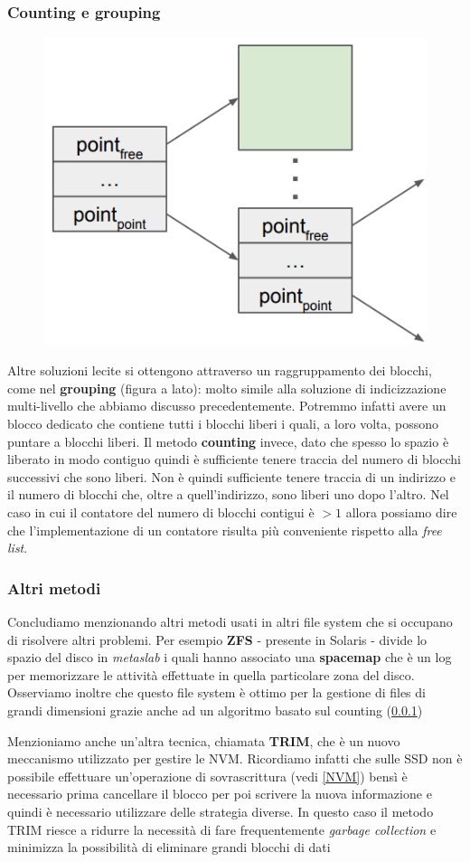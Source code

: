 \subsubsection{Counting e grouping}\label{Counting}
\begin{figure}
    \centering
    \includegraphics[width = .3\textwidth]{../res/imgs/file system implementation/grouping.png}
\end{figure}
Altre soluzioni lecite si ottengono attraverso un raggruppamento dei blocchi, come nel \textbf{grouping} (figura a lato): molto simile alla soluzione di indicizzazione multi-livello che abbiamo discusso precedentemente. Potremmo infatti avere un blocco dedicato che contiene tutti i blocchi liberi i quali, a loro volta, possono puntare a blocchi liberi. Il metodo \textbf{counting} invece, dato che spesso lo spazio è liberato in modo contiguo quindi è sufficiente tenere traccia del numero di blocchi successivi che sono liberi. Non è quindi sufficiente tenere traccia di un indirizzo e il numero di blocchi che, oltre a quell'indirizzo, sono liberi uno dopo l'altro. Nel caso in cui il contatore del numero di blocchi contigui è $> 1$ allora possiamo dire che l'implementazione di un contatore risulta più conveniente rispetto alla \textit{free list}.

% 
\subsubsection{Altri metodi}
Concludiamo menzionando altri metodi usati in altri file system che si occupano di risolvere altri problemi. Per esempio \textbf{ZFS} - presente in Solaris - divide lo spazio del disco in \textit{metaslab} i quali hanno associato una \textbf{spacemap} che è un log per memorizzare le attività effettuate in quella particolare zona del disco. Osserviamo inoltre che questo file system è ottimo per la gestione di files di grandi dimensioni grazie anche ad un algoritmo basato sul counting (\ref{Counting})

Menzioniamo anche un'altra tecnica, chiamata \textbf{TRIM}, che è un nuovo meccanismo utilizzato per gestire le NVM. Ricordiamo infatti che sulle SSD non è possibile effettuare un'operazione di sovrascrittura (vedi \ref{NVM}) bensì è necessario prima cancellare il blocco per poi scrivere la nuova informazione e quindi è necessario utilizzare delle strategia diverse. In questo caso il metodo TRIM riesce a ridurre la necessità di fare frequentemente \textit{garbage collection} e minimizza la possibilità di eliminare grandi blocchi di dati
